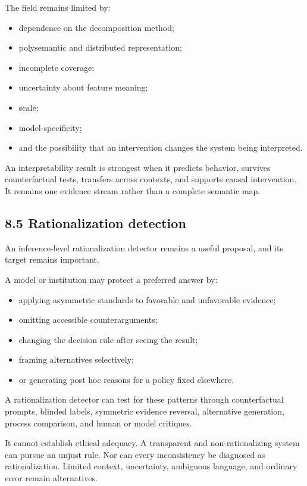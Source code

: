 \documentclass[
  11pt,
]{article}
\providecommand{\tightlist}{%
  \setlength{\itemsep}{0pt}\setlength{\parskip}{0pt}}
\begin{document}
The field remains limited by:

\begin{itemize}
\tightlist
\item
  dependence on the decomposition method;
\item
  polysemantic and distributed representation;
\item
  incomplete coverage;
\item
  uncertainty about feature meaning;
\item
  scale;
\item
  model-specificity;
\item
  and the possibility that an intervention changes the system being
  interpreted.
\end{itemize}

An interpretability result is strongest when it predicts behavior,
survives counterfactual tests, transfers across contexts, and supports
causal intervention. It remains one evidence stream rather than a
complete semantic map.

\subsection{8.5 Rationalization
detection}\label{rationalization-detection}

An inference-level rationalization detector remains a useful proposal,
and its target remains important.

A model or institution may protect a preferred answer by:

\begin{itemize}
\tightlist
\item
  applying asymmetric standards to favorable and unfavorable evidence;
\item
  omitting accessible counterarguments;
\item
  changing the decision rule after seeing the result;
\item
  framing alternatives selectively;
\item
  or generating post hoc reasons for a policy fixed elsewhere.
\end{itemize}

A rationalization detector can test for these patterns through
counterfactual prompts, blinded labels, symmetric evidence reversal,
alternative generation, process comparison, and human or model
critiques.

It cannot establish ethical adequacy. A transparent and
non-rationalizing system can pursue an unjust rule. Nor can every
inconsistency be diagnosed as rationalization. Limited context,
uncertainty, ambiguous language, and ordinary error remain alternatives.
\end{document}
